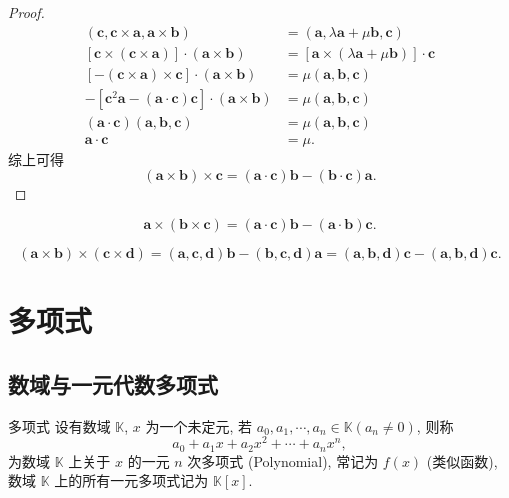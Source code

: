 \documentclass[cn,toc=twocol]{elegantbook}
\newcommand{\K}{\mathbb{K}}
\newcommand{\ve}[1]{\boldsymbol{#1}}
\newcommand{\vtimes}[2]{\ve{#1} \times \ve{#2}}
\begin{document}
\begin{proof}
\[\begin{aligned}
		(\ve c, \vtimes ca, \vtimes ab) &= (\ve a,\lambda \ve a + \mu \ve b, \ve c)\\
		[\ve c \times (\vtimes ca)] \cdot (\vtimes ab) &= [\ve a \times (\lambda \ve a + \mu \ve b)] \cdot \ve c\\
		[- (\vtimes ca) \times \ve c] \cdot (\vtimes ab) &= \mu (\ve a,\ve b, \ve c)\\
		-[\ve c^2 \ve a - (\ve a \cdot \ve c) \ve c] \cdot (\vtimes ab) &= \mu(\ve a,\ve b, \ve c)\\
		(\ve a \cdot \ve c) (\ve a,\ve b, \ve c) &= \mu (\ve a,\ve b, \ve c)\\
		\ve a \cdot \ve c &= \mu.
	\end{aligned}
	\]
	综上可得
	\[
		(\vtimes ab) \times \ve c = (\ve a \cdot \ve c)\ve {b} - (\ve b \cdot \ve c) \ve a.
	\]
\end{proof}

\begin{corollary}
	\[
	\ve a \times (\vtimes bc) = (\ve a \cdot \ve c) \ve b - (\ve a \cdot \ve b) \ve c.
	\]
\end{corollary}

\begin{corollary}
	\[
	(\vtimes ab) \times (\vtimes cd) = (\ve a, \ve c, \ve d) \ve b - (\ve b, \ve c, \ve d) \ve a  = (\ve a, \ve b, \ve d) \ve c - (\ve a, \ve b, \ve d) \ve c.
	\]
\end{corollary}



\chapter{多项式}

\section{数域与一元代数多项式}

\begin{definition}{多项式}
设有数域 $\K$, $x$ 为一个未定元, 若 $a_0, a_1 ,\cdots, a_n \in \K (a_n \neq 0)$, 则称
\[
	a_0 + a_1 x + a_2 x^2 + \cdots + a_n x^n,
\]
为数域 $\K$ 上关于 $x$ 的一元 $n$ 次多项式 (Polynomial), 常记为 $f(x)$ (类似函数), 数域 $\K$ 上的所有一元多项式记为 $\K[x]$.
\end{definition}
\end{document}
